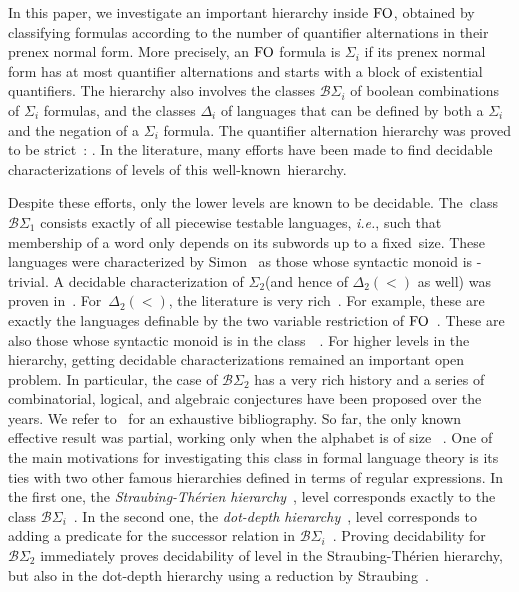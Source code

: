 \documentclass[envcountsame]{llncs}
\newcommand{\bscu}{\ensuremath{\mathcal{B}\Sigma_{1}}\xspace}
\newcommand{\dewd}{\ensuremath{\Delta_{2}(<)}\xspace}
\newcommand{\sicd}{\ensuremath{\Sigma_{2}}\xspace}
\newcommand{\bscd}{\ensuremath{\mathcal{B}\Sigma_{2}}\xspace}
\newcommand{\deci}{\ensuremath{\Delta_{i}}\xspace}
\newcommand{\sici}{\ensuremath{\Sigma_{i}}\xspace}
\newcommand{\bsci}{\ensuremath{\mathcal{B}\Sigma_{i}}\xspace}
\newcommand{\fo}{\ensuremath{\textup{FO}}\xspace}
\begin{document}
In this paper, we investigate an important hierarchy inside \fo, obtained by
classifying formulas according to the number of quantifier alternations in
their prenex normal form. More precisely, an \fo formula is \sici if its
prenex normal form has at most  quantifier alternations and starts with
a block of existential quantifiers. The hierarchy also involves the classes
\bsci of boolean combinations of \sici formulas, and the classes \deci of
languages that can be defined by both a \sici and the negation of a \sici
formula. The quantifier alternation hierarchy was proved to be
strict~\cite{BroKnaStrict,ThomStrict}: . In the
literature, many efforts have been made to find decidable characterizations of levels of
this well-known~hierarchy.

Despite these efforts, only the lower levels are known to be
decidable. The~class \bscu consists exactly of all piecewise testable
languages, \emph{i.e.}, such that membership of a word only depends on its
subwords up to a fixed~size. These languages were characterized by
Simon~\cite{simon75} as those whose syntactic monoid is
-trivial. A decidable characterization of \sicd (and hence of
\dewd as well) was proven in~\cite{arfi87}.  For~\dewd, the literature is very
rich~\cite{Tesson02diamondsare}. For example, these are exactly the languages
definable by the two variable restriction of \fo~\cite{twfodeux}. These are also those whose syntactic monoid
is in the class~~\cite{pwdelta}. For higher levels in the hierarchy, getting
decidable characterizations remained an important open problem. In particular,
the case of \bscd has a very rich history and a series of combinatorial,
logical, and algebraic conjectures have been proposed over the years.  We refer 
to~\cite{Pin-ThemeVar2011,AK2010,pinbridges,pin-straubing:upper} for an
exhaustive bibliography. So far, the only known effective result was partial,
working only when the alphabet is of size ~\cite{StrauDD2}. One of the main
motivations for investigating this class in formal language theory is its ties
with two other famous hierarchies defined in terms of regular expressions. In
the first one, the \emph{Straubing-Th\'erien
  hierarchy}~\cite{StrauConcat,TheConcat}, level  corresponds exactly to
the class \bsci~\cite{Thom82}. In the second one, the \emph{dot-depth
  hierarchy}~\cite{BrzoDot}, level  corresponds to adding a predicate for
the successor relation in \bsci~\cite{Thom82}. Proving decidability for \bscd
immediately proves decidability of level  in the Straubing-Th\'erien
hierarchy, but also in the dot-depth hierarchy using a reduction by
Straubing~\cite{StrauVD}.
\end{document}
